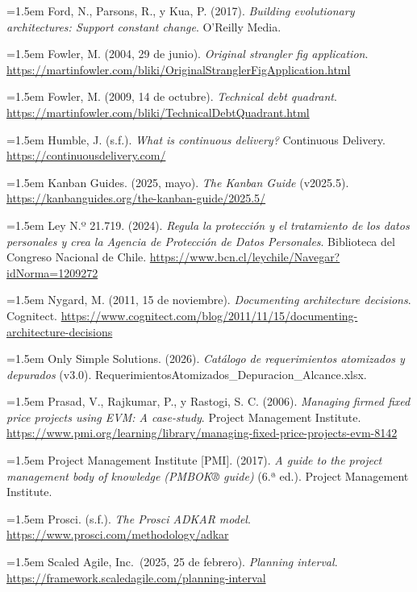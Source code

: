 \documentclass[11pt]{article}
\begin{document}
\noindent\hangindent=1.5em Ford, N., Parsons, R., y Kua, P. (2017). \emph{Building evolutionary architectures: Support constant change}. O'Reilly Media.

\noindent\hangindent=1.5em Fowler, M. (2004, 29 de junio). \emph{Original strangler fig application}. \url{https://martinfowler.com/bliki/OriginalStranglerFigApplication.html}

\noindent\hangindent=1.5em Fowler, M. (2009, 14 de octubre). \emph{Technical debt quadrant}. \url{https://martinfowler.com/bliki/TechnicalDebtQuadrant.html}

\noindent\hangindent=1.5em Humble, J. (s.f.). \emph{What is continuous delivery?} Continuous Delivery. \url{https://continuousdelivery.com/}

\noindent\hangindent=1.5em Kanban Guides. (2025, mayo). \emph{The Kanban Guide} (v2025.5). \url{https://kanbanguides.org/the-kanban-guide/2025.5/}

\noindent\hangindent=1.5em Ley N.º 21.719. (2024). \emph{Regula la protección y el tratamiento de los datos personales y crea la Agencia de Protección de Datos Personales}. Biblioteca del Congreso Nacional de Chile. \url{https://www.bcn.cl/leychile/Navegar?idNorma=1209272}

\noindent\hangindent=1.5em Nygard, M. (2011, 15 de noviembre). \emph{Documenting architecture decisions}. Cognitect. \url{https://www.cognitect.com/blog/2011/11/15/documenting-architecture-decisions}

\noindent\hangindent=1.5em Only Simple Solutions. (2026). \emph{Catálogo de requerimientos atomizados y depurados} (v3.0). RequerimientosAtomizados\_Depuracion\_Alcance.xlsx.

\noindent\hangindent=1.5em Prasad, V., Rajkumar, P., y Rastogi, S. C. (2006). \emph{Managing firmed fixed price projects using EVM: A case-study}. Project Management Institute. \url{https://www.pmi.org/learning/library/managing-fixed-price-projects-evm-8142}

\noindent\hangindent=1.5em Project Management Institute {[}PMI{]}. (2017). \emph{A guide to the project management body of knowledge (PMBOK® guide)} (6.ª ed.). Project Management Institute.

\noindent\hangindent=1.5em Prosci. (s.f.). \emph{The Prosci ADKAR model}. \url{https://www.prosci.com/methodology/adkar}

\noindent\hangindent=1.5em Scaled Agile, Inc.~(2025, 25 de febrero). \emph{Planning interval}. \url{https://framework.scaledagile.com/planning-interval}
\end{document}
